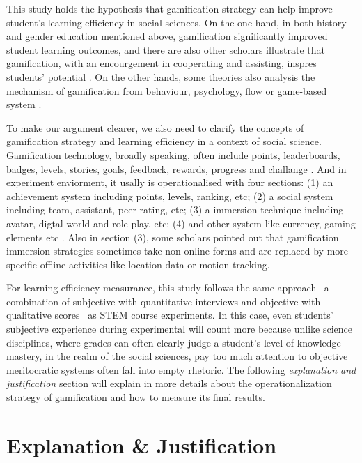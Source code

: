 \documentclass[12pt]{article} %
\begin{document}
\noindent This study holds the hypothesis that gamification strategy can help improve student's learning efficiency in social sciences. On the one hand, in both history and gender education mentioned above, gamification significantly improved student learning outcomes, and there are also other scholars illustrate that gamification, with an encourgement in cooperating and assisting, inspres students' potential \citep{korkmaz2020effect}. On the other hands, some theories also analysis the mechanism of gamification from behaviour, psychology, flow or game-based system \citep{krath2021revealing}.
\par
\noindent To make our argument clearer, we also need to clarify the concepts of gamification strategy and learning efficiency in a context of social science. Gamification technology, broadly speaking, often include points, leaderboards, badges, levels, stories, goals, feedback, rewards, progress and challange \citep{hamari2014does}. And in experiment enviorment, it usally is operationalised with four sections: (1) an achievement system including points, levels, ranking, etc; (2) a social system including team, assistant, peer-rating, etc; (3) a immersion technique including avatar, digtal world and role-play, etc; (4) and other system like currency, gaming elements etc \citep{caponetto2014gamification}. Also in section (3), some scholars pointed out that gamification immersion strategies sometimes take non-online forms and are replaced by more specific offline activities like location data or motion tracking\citep{abrams2014gamified, barata2013improving}.
\par
\noindent For learning efficiency measurance, this study follows the same approach \textemdash\ a combination of subjective with quantitative interviews and objective with qualitative scores \textemdash\ as STEM course experiments. In this case, even students' subjective experience during experimental will count more because unlike science disciplines, where grades can often clearly judge a student's level of knowledge mastery, in the realm of the social sciences, pay too much attention to objective meritocratic systems often fall into empty rhetoric. The following \textit{explanation and justification} section will explain in more details about the operationalization strategy of gamification and how to measure its final results.

\newpage

\section*{Explanation \& Justification}
\end{document}
